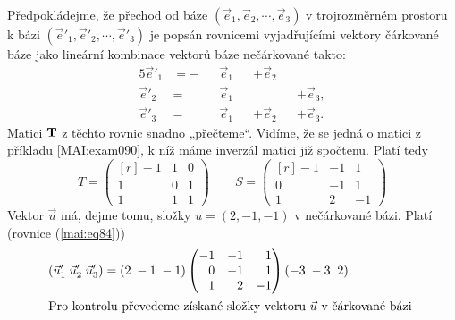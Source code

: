 % 
\begin{mdframed}[style=mdexam]
  \begin{example}\label{MAI:exam089}
    \begingroup
    \renewcommand\arraystretch{1.0}
    \renewcommand\arraycolsep{3pt}
    Předpokládejme, že přechod od báze \((\vec{e}_1, \vec{e}_2, \cdots, \vec{e}_3)\) v
    trojrozměrném prostoru k bázi \((\vec{e}'_1,\vec{e}'_2, \cdots, \vec{e}'_3)\) je popsán
    rovnicemi vyjadřujícími vektory čárkované báze jako lineární kombinace vektorů báze
    nečárkované takto:
    \begin{alignat*}{5}
      \vec{e}'_1&=-&& \vec{e}_1 && +\vec{e}_2 &&       \\
      \vec{e}'_2&= && \vec{e}_1 &&      && +\vec{e}_3, \\
      \vec{e}'_3&= && \vec{e}_1 && +\vec{e}_2 && +\vec{e}_3.    
    \end{alignat*}  
    Matici \(\mathbf{T}\) z těchto rovnic snadno „přečteme“. Vidíme, že se jedná o matici z
    příkladu \ref{MAI:exam090}, k níž máme inverzál matici již spočtenu. Platí tedy
    \begin{equation*}
      T = 
        \begin{pmatrix*}[r]
         -1 & 1 & 0 \\
          1 & 0 & 1 \\
          1 & 1 & 1 
        \end{pmatrix*} 
      \qquad
      S = 
      \begin{pmatrix*}[r]
        -1 & -1 &  1 \\
         0 & -1 &  1 \\
         1 &  2 & -1
      \end{pmatrix*}     
    \end{equation*}
    Vektor \(\vec{u}\) má, dejme tomu, složky \(u = (2, -1, -1)\) v nečárkované bázi. Platí
    (rovnice (\ref{mai:eq84}))
    \begin{gather*}    
      \begin{aligned}
        (\vec{u}'_1\; \vec{u}'_2\;  \vec{u}'_3) &= (2\; -1\; -1)
        \begin{pmatrix*}[r]
          -1 & -1 &  1 \\
           0 & -1 &  1 \\
           1 &  2 & -1
        \end{pmatrix*} 
        (-3\; -3\;\; 2).                            \\
        \shortintertext{Pro kontrolu převedeme získané složky vektoru \(\vec{u}\) v čárkované bázi 
}
\end{aligned}
\end{gather*}
\end{example}
\end{mdframed}
